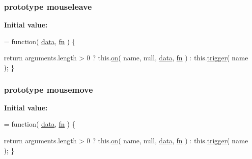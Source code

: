 \subsubsection[{mouseleave}]{ {\bf prototype} mouseleave}\label{jquery-1_810_82-vsdoc_8js_a97f1b922fe119361e2016713603fbbab}
{\bfseries Initial value\+:}
\begin{DoxyCode}
= \textcolor{keyword}{function}( \hyperlink{jquery-1_810_82-vsdoc_8js_a609407b3456fdc3c5671a9fc4a226ff7}{data}, \hyperlink{jquery-1_810_82-vsdoc_8js_acef6bdaf6b9b20fdcca1ea86f0902c3b}{fn} ) \{


        \textcolor{keywordflow}{return} arguments.length > 0 ?
            this.\hyperlink{jquery-1_810_82-vsdoc_8js_ae453b412b883f60220d73468ef6c6dbc}{on}( name, null, \hyperlink{jquery-1_810_82-vsdoc_8js_a609407b3456fdc3c5671a9fc4a226ff7}{data}, \hyperlink{jquery-1_810_82-vsdoc_8js_acef6bdaf6b9b20fdcca1ea86f0902c3b}{fn} ) :
            this.\hyperlink{jquery-1_810_82-vsdoc_8js_a2388c4114d5e3e4eab020f973641519c}{trigger}( name );
    \}
\end{DoxyCode}
\hypertarget{jquery-1_810_82-vsdoc_8js_a5b230e0d0748ddfdaef9b1a0fb09d254}{}
\subsubsection[{mousemove}]{ {\bf prototype} mousemove}\label{jquery-1_810_82-vsdoc_8js_a5b230e0d0748ddfdaef9b1a0fb09d254}
{\bfseries Initial value\+:}
\begin{DoxyCode}
= \textcolor{keyword}{function}( \hyperlink{jquery-1_810_82-vsdoc_8js_a609407b3456fdc3c5671a9fc4a226ff7}{data}, \hyperlink{jquery-1_810_82-vsdoc_8js_acef6bdaf6b9b20fdcca1ea86f0902c3b}{fn} ) \{


        \textcolor{keywordflow}{return} arguments.length > 0 ?
            this.\hyperlink{jquery-1_810_82-vsdoc_8js_ae453b412b883f60220d73468ef6c6dbc}{on}( name, null, \hyperlink{jquery-1_810_82-vsdoc_8js_a609407b3456fdc3c5671a9fc4a226ff7}{data}, \hyperlink{jquery-1_810_82-vsdoc_8js_acef6bdaf6b9b20fdcca1ea86f0902c3b}{fn} ) :
            this.\hyperlink{jquery-1_810_82-vsdoc_8js_a2388c4114d5e3e4eab020f973641519c}{trigger}( name );
    \}
\end{DoxyCode}
\hypertarget{jquery-1_810_82-vsdoc_8js_ac1acec291cac53826354688148db3718}{}

